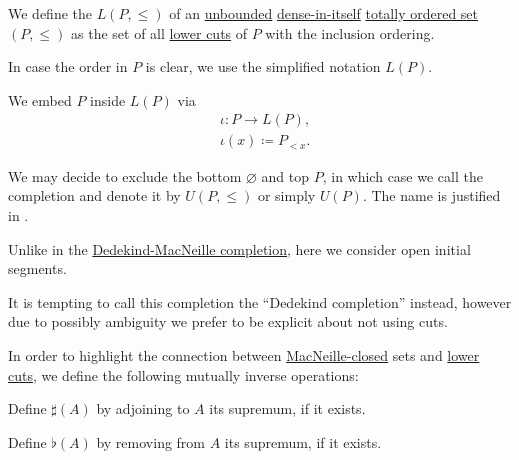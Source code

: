 \begin{definition}\label{def:lower_cut_completion}\mimprovised
  We define the  \( L(P, \leq) \) of an \hyperref[def:extremal_points/bounds]{unbounded} \hyperref[def:dense_total_order]{dense-in-itself} \hyperref[def:totally_ordered_set]{totally ordered set} \( (P, \leq) \) as the set of all \hyperref[def:lower_cut]{lower cuts} of \( P \) with the inclusion ordering.

  In case the order in \( P \) is clear, we use the simplified notation \( L(P) \).

  We embed \( P \) inside \( L(P) \) via
  \begin{equation*}
    \begin{aligned}
      &\iota: P \to L(P), \\
      &\iota(x) \coloneqq P_{<x}.
    \end{aligned}
  \end{equation*}

  We may decide to exclude the bottom \( \varnothing \) and top \( P \), in which case we call the completion  and denote it by \( U(P, \leq) \) or simply \( U(P) \). The name is justified in .
\end{definition}
\begin{comments}
  \item Unlike in the \hyperref[def:dedekind_macnielle_completion]{Dedekind-MacNeille completion}, here we consider open initial segments.
  \item It is tempting to call this completion the \enquote{Dedekind completion} instead, however due to possibly ambiguity we prefer to be explicit about not using cuts.
\end{comments}

\begin{definition}\label{def:lower_cut_closure}\mimprovised
  In order to highlight the connection between \hyperref[def:macnielle_closure]{MacNeille-closed} sets and \hyperref[def:lower_cut]{lower cuts}, we define the following mutually inverse operations:

  \begin{thmenum}
     Define \( \sharp(A) \) by adjoining to \( A \) its supremum, if it exists.

     Define \( \flat(A) \) by removing from \( A \) its supremum, if it exists.
  \end{thmenum}
\end{definition}

